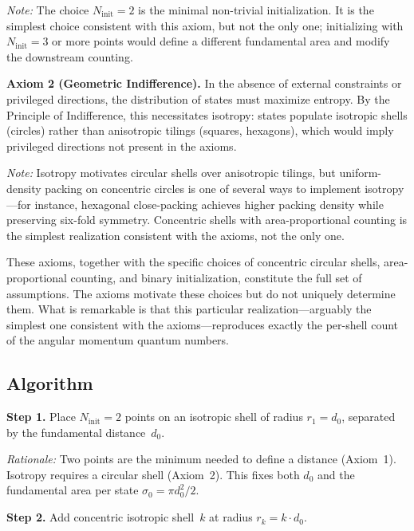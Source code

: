 \documentclass[aps,prl,reprint,amsmath,amssymb]{revtex4-2}
\begin{document}
\textit{Note:} The choice $N_{\mathrm{init}} = 2$ is the minimal
non-trivial initialization.  It is the simplest choice consistent with
this axiom, but not the only one; initializing with $N_{\mathrm{init}} = 3$
or more points would define a different fundamental area and modify the
downstream counting.

\medskip

\noindent\textbf{Axiom 2 (Geometric Indifference).}
In the absence of external constraints or privileged directions, the
distribution of states must maximize entropy.  By the Principle of
Indifference, this necessitates isotropy: states populate isotropic
shells (circles) rather than anisotropic tilings (squares, hexagons),
which would imply privileged directions not present in the axioms.

\textit{Note:} Isotropy motivates circular shells over anisotropic
tilings, but uniform-density packing on concentric circles is one of
several ways to implement isotropy---for instance, hexagonal
close-packing achieves higher packing density while preserving
six-fold symmetry.  Concentric shells with area-proportional counting
is the simplest realization consistent with the axioms, not the only
one.

\medskip

These axioms, together with the specific choices of concentric
circular shells, area-proportional counting, and binary initialization,
constitute the full set of assumptions.  The axioms motivate these
choices but do not uniquely determine them.  What is remarkable is that
this particular realization---arguably the simplest one consistent with
the axioms---reproduces exactly the per-shell count of the angular
momentum quantum numbers.

\subsection{Algorithm}

\noindent\textbf{Step 1.}  Place $N_{\mathrm{init}} = 2$ points on an
isotropic shell of radius $r_1 = d_0$, separated by the fundamental
distance~$d_0$.

\textit{Rationale:} Two points are the minimum needed to define a
distance (Axiom~1).  Isotropy requires a circular shell (Axiom~2).
This fixes both $d_0$ and the fundamental area per state
$\sigma_0 = \pi d_0^2 / 2$.

\medskip

\noindent\textbf{Step 2.}  Add concentric isotropic shell~$k$ at
radius $r_k = k \cdot d_0$.
\end{document}
